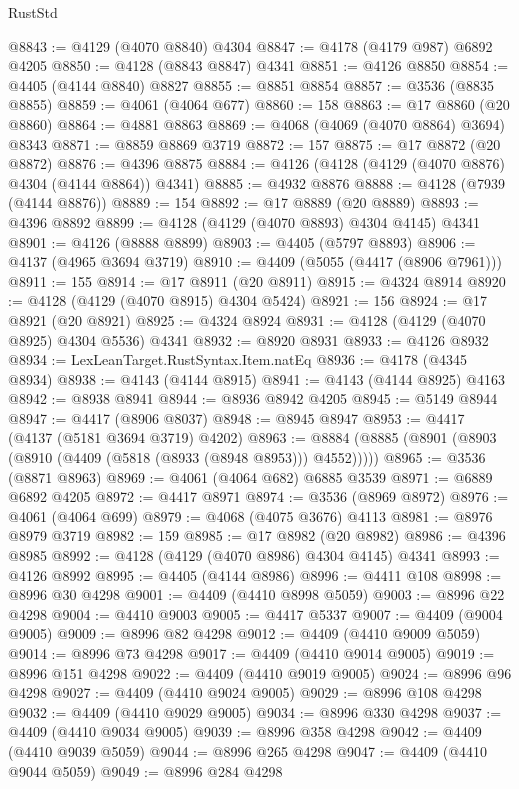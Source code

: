 \begin{lexlean}{RustStd}
\begin{coremodule}
@8843 := @4129 (@4070 @8840) @4304
@8847 := @4178 (@4179 @987) @6892 @4205
@8850 := @4128 (@8843 @8847) @4341
@8851 := @4126 @8850
@8854 := @4405 (@4144 @8840) @8827
@8855 := @8851 @8854
@8857 := @3536 (@8835 @8855)
@8859 := @4061 (@4064 @677)
@8860 := 158
@8863 := @17 @8860 (@20 @8860)
@8864 := @4881 @8863
@8869 := @4068 (@4069 (@4070 @8864) @3694) @8343
@8871 := @8859 @8869 @3719
@8872 := 157
@8875 := @17 @8872 (@20 @8872)
@8876 := @4396 @8875
@8884 := @4126 (@4128 (@4129 (@4070 @8876) @4304 (@4144 @8864)) @4341)
@8885 := @4932 @8876
@8888 := @4128 (@7939 (@4144 @8876))
@8889 := 154
@8892 := @17 @8889 (@20 @8889)
@8893 := @4396 @8892
@8899 := @4128 (@4129 (@4070 @8893) @4304 @4145) @4341
@8901 := @4126 (@8888 @8899)
@8903 := @4405 (@5797 @8893)
@8906 := @4137 (@4965 @3694 @3719)
@8910 := @4409 (@5055 (@4417 (@8906 @7961)))
@8911 := 155
@8914 := @17 @8911 (@20 @8911)
@8915 := @4324 @8914
@8920 := @4128 (@4129 (@4070 @8915) @4304 @5424)
@8921 := 156
@8924 := @17 @8921 (@20 @8921)
@8925 := @4324 @8924
@8931 := @4128 (@4129 (@4070 @8925) @4304 @5536) @4341
@8932 := @8920 @8931
@8933 := @4126 @8932
@8934 := LexLeanTarget.RustSyntax.Item.natEq
@8936 := @4178 (@4345 @8934)
@8938 := @4143 (@4144 @8915)
@8941 := @4143 (@4144 @8925) @4163
@8942 := @8938 @8941
@8944 := @8936 @8942 @4205
@8945 := @5149 @8944
@8947 := @4417 (@8906 @8037)
@8948 := @8945 @8947
@8953 := @4417 (@4137 (@5181 @3694 @3719) @4202)
@8963 := @8884 (@8885 (@8901 (@8903 (@8910 (@4409 (@5818 (@8933 (@8948 @8953))) @4552)))))
@8965 := @3536 (@8871 @8963)
@8969 := @4061 (@4064 @682) @6885 @3539
@8971 := @6889 @6892 @4205
@8972 := @4417 @8971
@8974 := @3536 (@8969 @8972)
@8976 := @4061 (@4064 @699)
@8979 := @4068 (@4075 @3676) @4113
@8981 := @8976 @8979 @3719
@8982 := 159
@8985 := @17 @8982 (@20 @8982)
@8986 := @4396 @8985
@8992 := @4128 (@4129 (@4070 @8986) @4304 @4145) @4341
@8993 := @4126 @8992
@8995 := @4405 (@4144 @8986)
@8996 := @4411 @108
@8998 := @8996 @30 @4298
@9001 := @4409 (@4410 @8998 @5059)
@9003 := @8996 @22 @4298
@9004 := @4410 @9003
@9005 := @4417 @5337
@9007 := @4409 (@9004 @9005)
@9009 := @8996 @82 @4298
@9012 := @4409 (@4410 @9009 @5059)
@9014 := @8996 @73 @4298
@9017 := @4409 (@4410 @9014 @9005)
@9019 := @8996 @151 @4298
@9022 := @4409 (@4410 @9019 @9005)
@9024 := @8996 @96 @4298
@9027 := @4409 (@4410 @9024 @9005)
@9029 := @8996 @108 @4298
@9032 := @4409 (@4410 @9029 @9005)
@9034 := @8996 @330 @4298
@9037 := @4409 (@4410 @9034 @9005)
@9039 := @8996 @358 @4298
@9042 := @4409 (@4410 @9039 @5059)
@9044 := @8996 @265 @4298
@9047 := @4409 (@4410 @9044 @5059)
@9049 := @8996 @284 @4298

\end{coremodule}
\end{lexlean}
